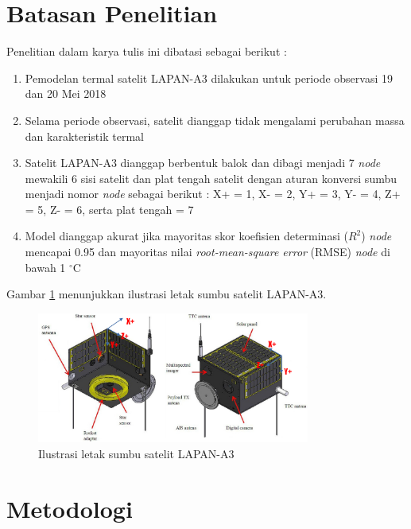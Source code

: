 \section{Batasan Penelitian}

Penelitian dalam karya tulis ini dibatasi sebagai berikut :

\begin{enumerate}
\item Pemodelan termal satelit LAPAN-A3 dilakukan untuk periode observasi 19 dan 20 Mei 2018
\item Selama periode observasi, satelit dianggap tidak mengalami perubahan massa dan karakteristik termal
\item Satelit LAPAN-A3 dianggap berbentuk balok dan dibagi menjadi 7
	\textit{node} mewakili 6 sisi satelit dan plat tengah satelit dengan aturan
		konversi sumbu menjadi nomor \textit{node} sebagai berikut : X+ = 1, X- =
		2, Y+ = 3, Y- = 4, Z+ = 5, Z- = 6, serta plat tengah = 7
	\item Model dianggap akurat jika mayoritas skor koefisien determinasi ($R^2$) \textit{node} mencapai 0.95 dan mayoritas nilai \textit{root-mean-square error} (RMSE) \textit{node} di bawah 1 $^\circ$C
\end{enumerate}

Gambar \ref{fig:sumbua3} menunjukkan ilustrasi letak sumbu satelit LAPAN-A3.

\begin{figure}[H]
\setlength{}
\begin{center}
\includegraphics[width=0.8\textwidth]{fig/sumbua3.png}
\caption{Ilustrasi letak sumbu satelit LAPAN-A3}
\label{fig:sumbua3}
\end{center}
\end{figure}


\section{Metodologi}

